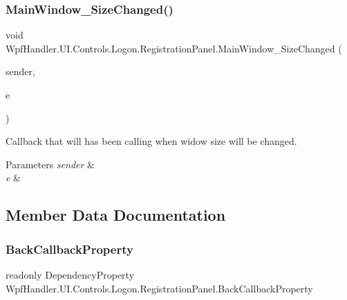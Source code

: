 \subsubsection{\texorpdfstring{Main\+Window\+\_\+\+Size\+Changed()}{MainWindow\_SizeChanged()}}
{\footnotesize\ttfamily void Wpf\+Handler.\+U\+I.\+Controls.\+Logon.\+Registration\+Panel.\+Main\+Window\+\_\+\+Size\+Changed (\begin{DoxyParamCaption}\item[{object}]{sender,  }\item[{Size\+Changed\+Event\+Args}]{e }\end{DoxyParamCaption})\hspace{0.3cm}{\ttfamily [private]}}



Callback that will has been calling when widow size will be changed. 


\begin{DoxyParams}{Parameters}
{\em sender} & \\
\hline
{\em e} & \\
\hline
\end{DoxyParams}


\subsection{Member Data Documentation}
\mbox{\label{class_wpf_handler_1_1_u_i_1_1_controls_1_1_logon_1_1_registration_panel_ab31a831af5a6c9be9f96671b983cada3}} 
\subsubsection{\texorpdfstring{Back\+Callback\+Property}{BackCallbackProperty}}
{\footnotesize\ttfamily readonly Dependency\+Property Wpf\+Handler.\+U\+I.\+Controls.\+Logon.\+Registration\+Panel.\+Back\+Callback\+Property\hspace{0.3cm}{\ttfamily [static]}}

